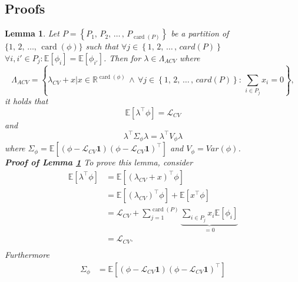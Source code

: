 \documentclass[11pt,dvipsnames]{article}
\newtheorem{lemma}{Lemma}
\DeclareMathOperator{\cardt}{card}
\begin{document}
\begin{appendices}

\section{Proofs}\label{appendix:Proofs}
\begin{lemma} \label{lemma:Partition}
Let $ P=\left\lbrace P_{1},\, P_{2},\, \dots\,,\,P_{\cardt(P)} \right\rbrace  $ be a partition of $ \lbrace 1,\,2,\,\ldots,\,\cardt(\phi)\rbrace $ such that $ \forall j \in \left\lbrace 1,\, 2,\, \dots\,,\,card(P) \right\rbrace $  $ \forall i,i' \in P_{j}: \mathbb{E}[\phi_{i}]=\mathbb{E}[\phi_{i'}] $. Then for $ \lambda \in \Lambda_{ACV} $ where 
\begin{equation}\label{eq:LambdaACV} 
\Lambda_{ACV}=\left\lbrace \lambda_{CV}+x \Bigg| x \in \mathbb{R}^{\cardt(\phi)}\,\wedge\, \forall j \in \left\lbrace 1,\, 2,\, \dots\,,\,card(P) \right\rbrace:\, \sum_{i\in P_{j}} x_{i}=0 \right\rbrace,
\end{equation}
it holds that
\begin{equation}
\mathbb{E}[\lambda^{\top}\phi]=\mathcal{L}_{CV} 
\end{equation}
and
\begin{equation}
\lambda^{\top} \Sigma_{\phi} \lambda= \lambda^{\top} V_{\phi} \lambda
\end{equation}
where $ \Sigma_{\phi}=\mathbb{E}\left[ (\phi-\mathcal{L}_{CV} \mathbf{1})(\phi-\mathcal{L}_{CV} \mathbf{1})^{\top} \right]  $ and $ V_{\phi}=Var(\phi) $.\\
\textbf{\textup{Proof of Lemma \ref{lemma:Partition}}}
To prove this lemma, consider
\begin{equation}
\begin{split}
\mathbb{E}[\lambda^{\top}\phi]
&=\mathbb{E}[\left( \lambda_{CV}+x\right) ^{\top}\phi]\\
&=\mathbb{E}[\left( \lambda_{CV}\right) ^{\top}\phi]+\mathbb{E}[x^{\top}\phi]\\
&=\mathcal{L}_{CV}+\sum_{j=1}^{\cardt(P)}\underbrace{\sum_{i\in P_{j}}x_{i}\mathbb{E}[\phi_{i}]}_{=0}\\
&=\mathcal{L}_{CV}.\\
\end{split}
\end{equation}
Furthermore
\begin{equation}
\begin{split}
\Sigma_{\phi}
&=\mathbb{E}[\left( \phi - \mathcal{L}_{CV}\mathbf{1}\right) \left( \phi - \mathcal{L}_{CV}\mathbf{1}\right)^{\top} ]\\

\end{split}
\end{equation}
\end{lemma}
\end{appendices}
\end{document}
